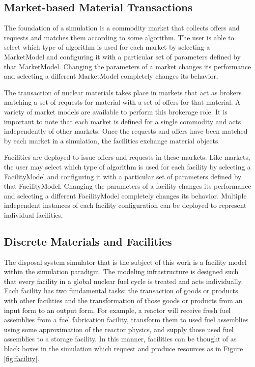 \subsection{Market-based Material Transactions}

The foundation of a simulation is a commodity market that collects 
offers and requests and matches them according to some algorithm.  The 
user is able to select which type of algorithm is used for each market 
by selecting a MarketModel and configuring it with a particular set of 
parameters defined by that MarketModel.  Changing the parameters of a 
market changes its performance and selecting a different MarketModel 
completely changes its behavior.

The transaction of nuclear materials takes place in markets that act
as brokers matching a set of requests for material with a set of
offers for that material. A variety of market models are available
to perform this brokerage role. It is important to note that each
market is defined for a single commodity and acts independently of
other markets. Once the requests and offers have been matched by each
market in a simulation, the facilities exchange material objects.

Facilities are deployed to issue offers and requests in these markets.  
Like markets, the user may select which type of algorithm is used for 
each facility by selecting a FacilityModel and configuring it with a 
particular set of parameters defined by that FacilityModel.  Changing 
the parameters of a facility changes its performance and selecting a 
different FacilityModel completely changes its behavior.  
Multiple independent instances of each facility configuration 
can be deployed to represent individual facilities.


\subsection{Discrete Materials and Facilities}

The \Cyder disposal system simulator that is the subject of this work is a facility model 
within the \Cyclus simulation paradigm.  The \Cyclus modeling infrastructure is 
designed such that every facility in a global nuclear fuel cycle is treated and 
acts individually.  Each facility has two fundamental tasks: the transaction of 
goods or products with other facilities and the transformation of those goods 
or products from an input form to an output form.  For example, a reactor will 
receive fresh fuel assemblies from a fuel fabrication facility, transform them 
to used fuel assemblies using some approximation of the reactor physics, and 
supply those used fuel assemblies to a storage facility. In this manner, 
facilities can be thought of as black boxes in the simulation which request and 
produce resources as in Figure \ref{fig:facility}.

